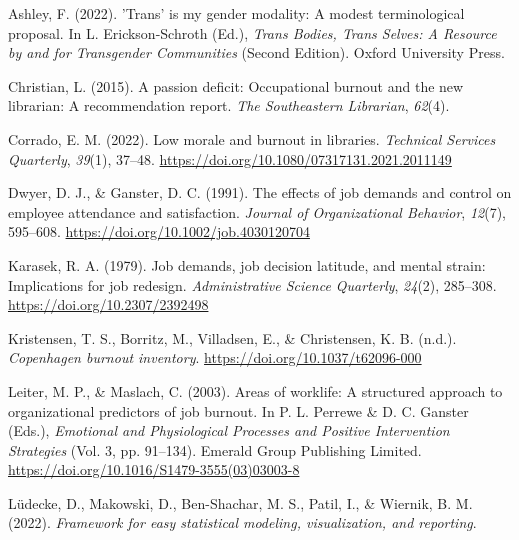 \documentclass[
  twocolumn]{article}
\newlength{\cslhangindent}
\newenvironment{CSLReferences}[2] %
 {\begin{list}{}{%
  \setlength{\itemindent}{0pt}
  \setlength{\leftmargin}{0pt}
  \setlength{\parsep}{0pt}
  \ifodd #1
   \setlength{\leftmargin}{\cslhangindent}
   \setlength{\itemindent}{-1\cslhangindent}
  \fi
  \setlength{\itemsep}{#2\baselineskip}}}
 {\end{list}}
\begin{document}
\label{refs}
\begin{CSLReferences}{1}{0}
Ashley, F. (2022). 'Trans' is my gender modality: A modest
terminological proposal. In L. Erickson-Schroth (Ed.), \emph{Trans
{Bodies}, {Trans Selves}: {A Resource} by and for {Transgender
Communities}} (Second Edition). Oxford University Press.

Christian, L. (2015). A passion deficit: Occupational burnout and the
new librarian: A recommendation report. \emph{The Southeastern
Librarian}, \emph{62}(4).

Corrado, E. M. (2022). Low morale and burnout in libraries.
\emph{Technical Services Quarterly}, \emph{39}(1), 37--48.
\url{https://doi.org/10.1080/07317131.2021.2011149}

Dwyer, D. J., \& Ganster, D. C. (1991). The effects of job demands and
control on employee attendance and satisfaction. \emph{Journal of
Organizational Behavior}, \emph{12}(7), 595--608.
\url{https://doi.org/10.1002/job.4030120704}

Karasek, R. A. (1979). Job demands, job decision latitude, and mental
strain: Implications for job redesign. \emph{Administrative Science
Quarterly}, \emph{24}(2), 285--308.
\url{https://doi.org/10.2307/2392498}

Kristensen, T. S., Borritz, M., Villadsen, E., \& Christensen, K. B.
(n.d.). \emph{Copenhagen burnout inventory}.
\url{https://doi.org/10.1037/t62096-000}

Leiter, M. P., \& Maslach, C. (2003). Areas of worklife: A structured
approach to organizational predictors of job burnout. In P. L. Perrewe
\& D. C. Ganster (Eds.), \emph{Emotional and {Physiological Processes}
and {Positive Intervention Strategies}} (Vol. 3, pp. 91--134). Emerald
Group Publishing Limited.
\url{https://doi.org/10.1016/S1479-3555(03)03003-8}

Lüdecke, D., Makowski, D., Ben-Shachar, M. S., Patil, I., \& Wiernik, B.
M. (2022). \emph{Framework for easy statistical modeling, visualization,
and reporting}.


\end{CSLReferences}
\end{document}
